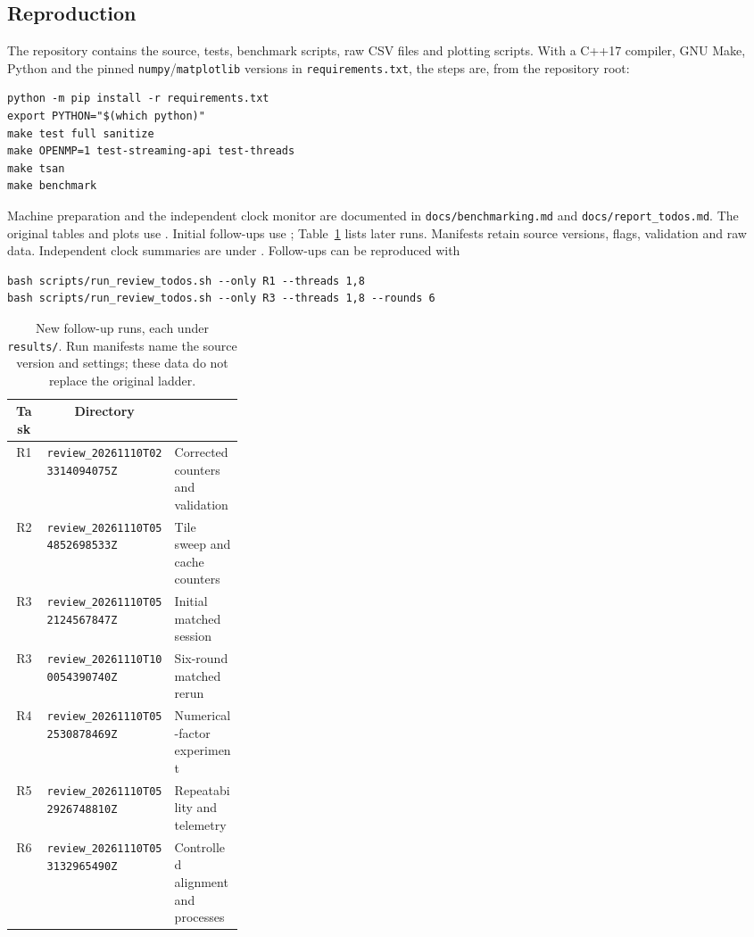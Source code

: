\documentclass[11pt,a4paper]{article}
\begin{document}
\subsection{Reproduction}
\label{sec:repro}
The repository contains the source, tests, benchmark scripts, raw CSV files and
plotting scripts. With a C++17 compiler, GNU Make, Python and the pinned
\texttt{numpy}/\texttt{matplotlib} versions in \texttt{requirements.txt}, the
steps are, from the repository root:
\begin{verbatim}
python -m pip install -r requirements.txt
export PYTHON="$(which python)"
make test full sanitize
make OPENMP=1 test-streaming-api test-threads
make tsan
make benchmark
\end{verbatim}
\begingroup\raggedright
Machine preparation and the independent clock monitor are documented in
\texttt{docs/benchmarking.md} and \texttt{docs/report\_todos.md}.
The original tables and plots use
.
Initial follow-ups use ;
Table~\ref{tab:review-sources} lists later runs. Manifests retain source versions,
flags, validation and raw data. Independent clock summaries are under
. Follow-ups can be reproduced with
\begin{verbatim}
bash scripts/run_review_todos.sh --only R1 --threads 1,8
bash scripts/run_review_todos.sh --only R3 --threads 1,8 --rounds 6
\end{verbatim}

\endgroup

\begin{table}[!htbp]
\centering
\fontsize{9}{11}\selectfont
\setlength{\tabcolsep}{5pt}
\renewcommand{\arraystretch}{1.16}
\caption{New follow-up runs, each under \texttt{results/}. Run manifests name
the source version and settings; these data do not replace the original ladder.}
\label{tab:review-sources}
\begin{tabular}{@{}c l >{\raggedright\arraybackslash}p{0.30\linewidth}@{}}
\toprule
Task & \multicolumn{1}{c}{Directory} & \multicolumn{1}{c}{Evidence} \\
\midrule
R1 & \texttt{review\_20261110T023314094075Z} & Corrected counters and validation \\
R2 & \texttt{review\_20261110T054852698533Z} & Tile sweep and cache counters \\
R3 & \texttt{review\_20261110T052124567847Z} & Initial matched session \\
R3 & \texttt{review\_20261110T100054390740Z} & Six-round matched rerun \\
R4 & \texttt{review\_20261110T052530878469Z} & Numerical-factor experiment \\
R5 & \texttt{review\_20261110T052926748810Z} & Repeatability and telemetry \\
R6 & \texttt{review\_20261110T053132965490Z} & Controlled alignment and processes \\
\bottomrule
\end{tabular}
\end{table}
\end{document}
